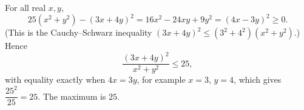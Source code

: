 For all real $x,y$,
\[25\left(x^2+y^2\right)-(3x+4y)^2=16x^2-24xy+9y^2=(4x-3y)^2\ge0 .\]
(This is the Cauchy--Schwarz inequality $(3x+4y)^2\le\left(3^2+4^2\right)\left(x^2+y^2\right)$.) Hence
\[\dfrac{(3x+4y)^2}{x^2+y^2}\le25,\]
with equality exactly when $4x=3y$, for example $x=3$, $y=4$, which gives $\dfrac{25^2}{25}=25$. The maximum is $\boxed{25}$.
